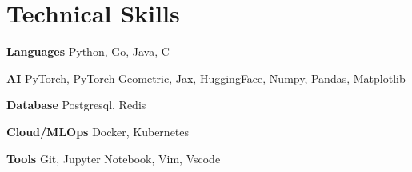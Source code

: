 
\section{Technical Skills}\vspace{-1.0em}
\begin{multicols}{2}
	\begin{compactitem}
		\item \textbf{Languages} Python, Go, Java, C 
		\item \textbf{AI} PyTorch, PyTorch Geometric, Jax, HuggingFace, Numpy, Pandas, Matplotlib 
		\item \textbf{Database} Postgresql, Redis
		
		\item \textbf{Cloud/MLOps} Docker, Kubernetes 
		\item \textbf{Tools} Git, Jupyter Notebook, Vim, Vscode
	\end{compactitem}
\end{multicols}